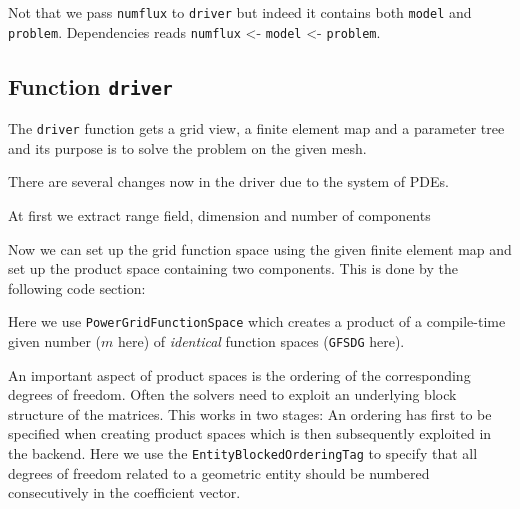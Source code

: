 \documentclass[a4paper,12pt]{article}
\theoremstyle{definition}
\theoremstyle{definition}
\begin{document}
Not that we pass \lstinline{numflux} to \lstinline{driver} but indeed it contains both \lstinline{model}   and \lstinline{problem}. Dependencies reads
\lstinline{numflux} <- \lstinline{model} <- \lstinline{problem}.
\subsection{Function \lstinline{driver}}
\label{sec:funct-driver}

The \lstinline{driver} function gets a grid view, a finite element
map and a parameter tree and its purpose is to solve the problem on
the given mesh.

There are several changes now in the driver due to the system of PDEs.

At first we extract range field, dimension and number of components




Now we can set up the grid function space using the given finite
element map and set up the product space containing
two components. This is done by the following code section:



Here we use \lstinline{PowerGridFunctionSpace} which creates
a product of a compile-time given number ($m$ here) of \textit{identical} function spaces (\lstinline{GFSDG} here). 


An important aspect of product spaces is the ordering of the corresponding degrees
of freedom. Often the solvers need to exploit an underlying block structure
of the matrices. This works in two stages: An ordering has first to be specified when creating product spaces
which is then subsequently exploited in the backend.
Here we use the \lstinline{EntityBlockedOrderingTag} to specify that all degrees of
freedom related to a geometric entity should be numbered consecutively in
the coefficient vector.



\end{document}
